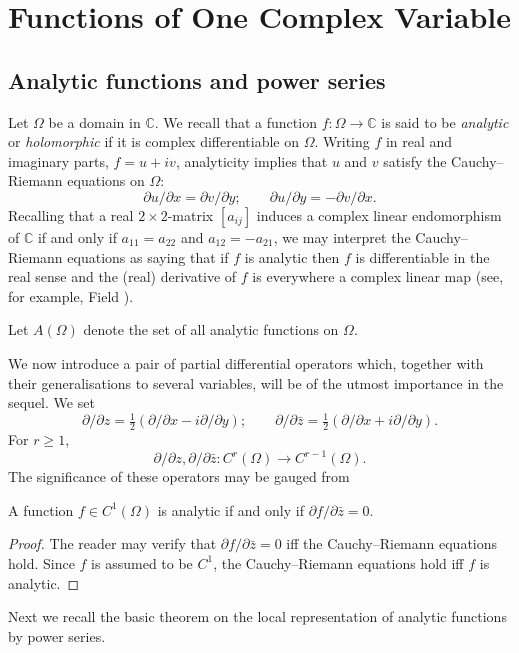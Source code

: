 \chapter{Functions of One Complex Variable}\label{ch:1}
\ChapterOneIntroduction

\section{Analytic functions and power series}\label{sec:1:1}
Let $\Omega$ be a domain in $\mathbb C$. We recall that a function $f:\Omega\to\mathbb C$ is said to be \emph{analytic} or \emph{holomorphic} if it is complex differentiable on $\Omega$. Writing $f$ in real and imaginary parts, $f=u+iv$, analyticity implies that $u$ and $v$ satisfy the Cauchy--Riemann equations on $\Omega$:
\[
\partial u/\partial x=\partial v/\partial y;\qquad \partial u/\partial y=-\partial v/\partial x.
\]
Recalling that a real $2\times2$-matrix $[a_{ij}]$ induces a complex linear endomorphism of $\mathbb C$ if and only if $a_{11}=a_{22}$ and $a_{12}=-a_{21}$, we may interpret the Cauchy--Riemann equations as saying that if $f$ is analytic then $f$ is differentiable in the real sense and the (real) derivative of $f$ is everywhere a complex linear map (see, for example, Field \cite[Example 3, page 133]{bib:I:field-m-j:1}).

Let $A(\Omega)$ denote the set of all analytic functions on $\Omega$.

We now introduce a pair of partial differential operators which, together with their generalisations to several variables, will be of the utmost importance in the sequel. We set
\[
\partial/\partial z=\tfrac12(\partial/\partial x-i\partial/\partial y);\qquad
\partial/\partial\bar z=\tfrac12(\partial/\partial x+i\partial/\partial y).
\]
For $r\geq1$,
\[
\partial/\partial z,\partial/\partial\bar z:C^r(\Omega)\longrightarrow C^{r-1}(\Omega).
\]
The significance of these operators may be gauged from

 A function $f\in C^1(\Omega)$ is analytic if and only if $\partial f/\partial\bar z=0$.
\begin{proof} The reader may verify that $\partial f/\partial\bar z=0$ iff the Cauchy--Riemann equations hold. Since $f$ is assumed to be $C^1$, the Cauchy--Riemann equations hold iff $f$ is analytic. \end{proof}
Next we recall the basic theorem on the local representation of analytic functions by power series.

